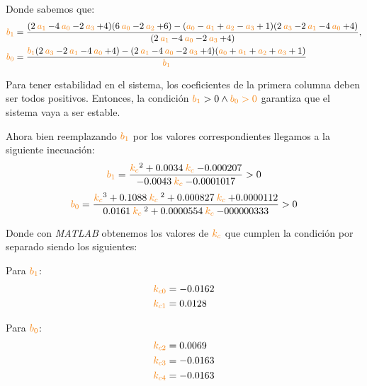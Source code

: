 Donde sabemos que:
\begin{align}
  \nara{b_1} &= \frac{( 2\nara{a_1} - 4\nara{a_0} - 2 \nara{a_3} +4 )( 6\nara{a_0} - 2\nara{a_2} +6 )- (\nara{a_0} - \nara{a_1} + \nara{a_2} -\nara{a_3} + 1)(2\nara{a_3} - 2\nara{a_1} - 4\nara{a_0} + 4 ) }{( 2\nara{a_1} - 4\nara{a_0} - 2 \nara{a_3} +4 ) },\\ 
  \nara{b_0} &= \frac{\nara{b_1} (2\nara{a_3} - 2\nara{a_1} - 4\nara{a_0} + 4 ) -( 2\nara{a_1} - 4\nara{a_0} - 2 \nara{a_3} +4 ) (\nara{a_0} + \nara{a_1} + \nara{a_2} +\nara{a_3} + 1) }{\nara{b_1}}
\end{align}

Para tener estabilidad en el sistema, los coeficientes de la primera columna
deben ser todos positivos. Entonces, la condición $\nara{b_1} > 0 \land \nara{b_0>0}$ garantiza
que el sistema vaya a ser estable.

Ahora bien reemplazando $\nara{b_1}$ por los valores correspondientes llegamos
a la siguiente inecuación: %
\begin{equation}
    \nara{b_1} = \frac{\nara{k_c}^2  +0.0034 \nara{k_c}  -0.000207}{-0.0043
    \nara{k_c}  -0.0001017} > 0
\end{equation}
\begin{equation}
    \nara{b_0} = \frac{\nara{k_c}^3  + 0.1088\nara{k_c}^2  +0.000827 \nara{k_c} +0.0000112}{0.0161\nara{k_c}^2   +0.0000554\nara{k_c} -000000333} > 0
\end{equation}

Donde con \textit{MATLAB} obtenemos los valores de $\nara{k_c}$ que cumplen la condición por separado siendo los siguientes:

\vspace*{0.2cm}

    \begin{multicols}{2}
        Para $\nara{b_1}$: 
        \begin{align}
            \nara{k_{c0}} & = -0.0162 \\
            \nara{k_{c1}} & = 0.0128
        \end{align}

        \columnbreak
        
        Para $\nara{b_0}$:
        \begin{align}
            \nara{k_{c2}} & = 0.0069 \\
            \nara{k_{c3}} & = -0.0163 \\
            \nara{k_{c4}} & = -0.0163
        \end{align}
    \end{multicols}

